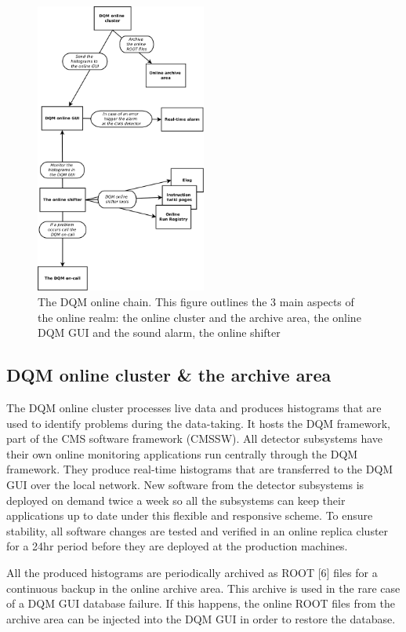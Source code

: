\documentclass[journal]{IEEEtran}
\begin{document}
\begin{figure}
\includegraphics[width=0.5\textwidth, keepaspectratio=true]{OnlineChain.png}
\caption{The DQM online chain. This figure outlines the 3 main aspects of the online realm: the online cluster and the archive area, the online DQM GUI and the sound alarm, the online shifter}
\label{OnlineChain}
\end{figure}

\subsection{DQM online cluster \& the archive area}
The DQM online cluster processes live data and produces histograms that are used to identify problems during the data-taking. It hosts the DQM framework, part of the CMS software framework (CMSSW). All detector subsystems have their own online monitoring applications run centrally through the DQM framework. They produce real-time histograms that are transferred to the DQM GUI over the local network. New software from the detector subsystems is deployed on demand twice a week so all the subsystems can keep their applications up to date under this flexible and responsive scheme. To ensure stability, all software changes are tested and verified in an online replica cluster for a 24hr period before they are deployed at the production machines.

All the produced histograms are periodically archived as ROOT [6] files for a continuous backup in the online archive area. This archive is used in the rare case of a DQM GUI database failure. If this happens, the online ROOT files from the archive area can be injected into the DQM GUI in order to restore the database.
\end{document}
